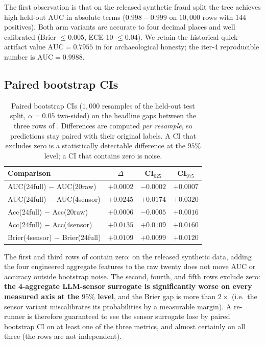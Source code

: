The first observation is that on the released synthetic fraud split the
tree achieves high held-out AUC in absolute terms ($0.998{-}0.999$ on
$10{,}000$ rows with $144$ positives). Both arm variants are accurate to
four decimal places and well calibrated (Brier $\le 0.005$, ECE-10
$\le 0.04$). We retain the historical quick-artifact value
$\mathrm{AUC}{=}0.7955$ in  for archaeological
honesty; the iter-4 reproducible number is $\mathrm{AUC}{=}0.9988$.

\subsection{Paired bootstrap CIs}

\begin{table}[t]
\centering
\small
\caption{Paired bootstrap CIs ($1{,}000$ resamples of the held-out test
split, $\alpha{=}0.05$ two-sided) on the headline gaps between the three
rows of . Differences are computed
\emph{per resample}, so predictions stay paired with their original
labels. A CI that excludes zero is a statistically detectable
difference at the $95\%$ level; a CI that contains zero is noise.}
\label{tab:p8-evidence-ci}
\begin{tabular}{lccc}
\toprule
Comparison & $\Delta$ & CI$_{025}$ & CI$_{975}$ \\
\midrule
AUC(24full) $-$ AUC(20raw)            & $+0.0002$ & $-0.0002$ & $+0.0007$ \\
AUC(24full) $-$ AUC(4sensor)          & $+0.0245$ & $+0.0174$ & $+0.0320$ \\
Acc(24full) $-$ Acc(20raw)            & $+0.0006$ & $-0.0005$ & $+0.0016$ \\
Acc(24full) $-$ Acc(4sensor)          & $+0.0135$ & $+0.0109$ & $+0.0160$ \\
Brier(4sensor) $-$ Brier(24full)      & $+0.0109$ & $+0.0099$ & $+0.0120$ \\
\bottomrule
\end{tabular}
\end{table}

The first and third rows of  contain zero:
on the released synthetic data, adding the four engineered aggregate
features to the raw twenty does not move AUC or accuracy outside
bootstrap noise. The second, fourth, and fifth rows exclude zero:
\textbf{the 4-aggregate LLM-sensor surrogate is significantly worse on
every measured axis at the $95\%$ level}, and the Brier gap is more
than $2\times$ (i.e.\ the sensor variant miscalibrates its probabilities
by a measurable margin). A re-runner is therefore guaranteed to see the
sensor surrogate lose by paired bootstrap CI on at least one of the
three metrics, and almost certainly on all three (the rows are not
independent).

